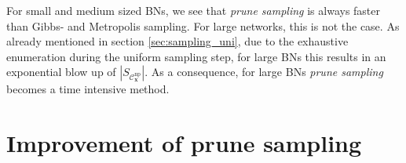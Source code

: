 \documentclass[a4paper, twoside, 11pt]{report}
\newcommand{\bfx}{{\mathbf{x}}}
\newcommand{\C}{{\mathcal C}}
\theoremstyle{plain}
\theoremstyle{definition}
\theoremstyle{remark}
\newcommand{\ps}{\textit{prune sampling }}
\begin{document}
For small and medium sized BNs, we see that \ps is always faster than Gibbs- and Metropolis sampling. For large networks, this is not the case. As already mentioned in section \ref{sec:sampling_uni}, due to the exhaustive enumeration during the uniform sampling step, for large BNs this results in an exponential blow up of $|S_{\C_\bfx^{\text{np}}}|$. As a consequence, for large BNs \ps becomes a time intensive method.

%
%
\chapter{Improvement of prune sampling}\label{ch:5}
\end{document}

